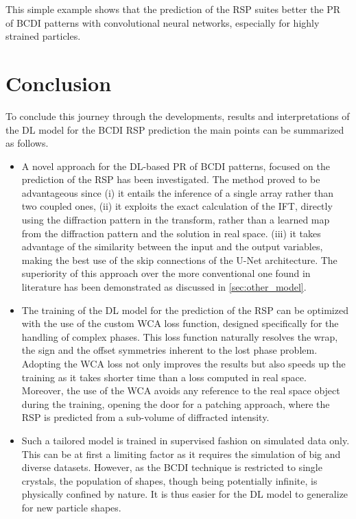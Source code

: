 This simple example shows that the prediction of the RSP suites better the PR of BCDI patterns with convolutional 
neural networks, especially for highly strained particles. 

\section{Conclusion}

To conclude this journey through the developments, results and interpretations of the DL model for the BCDI RSP prediction 
the main points can be summarized as follows.
\begin{itemize}

    \item A novel approach for the DL-based PR of BCDI patterns, focused on the prediction of the RSP has been investigated. 
    The method proved to be advantageous since (i) it entails the inference of a single array rather than two coupled ones, 
    (ii) it exploits the exact calculation of the IFT, directly using the diffraction pattern in the transform, rather than 
    a learned map from the diffraction pattern and the solution in real space. (iii) it takes advantage of the similarity between 
    the input and the output variables, making the best use of the skip connections of the U-Net architecture.
    The superiority of this approach over the more conventional one found in literature has been demonstrated as discussed in 
    \ref{sec:other_model}. 

    \item The training of the DL model for the prediction of the RSP can be optimized with the use of the custom WCA loss function, 
    designed specifically for the handling of complex phases. This loss function naturally resolves the wrap, the sign 
    and the offset symmetries inherent to the lost phase problem. Adopting the WCA loss not only improves the results but also 
    speeds up the training as it takes shorter time than a loss computed in real space. Moreover, the use of the WCA avoids 
    any reference to the real space object during the training, opening the door for a patching approach, where the RSP is 
    predicted from a sub-volume of diffracted intensity. 

    \item Such a tailored model is trained in supervised fashion on simulated data only. This can be at first a limiting factor 
    as it requires the simulation of big and diverse datasets. However, as the BCDI technique is restricted to single 
    crystals, the population of shapes, though being potentially infinite, is physically confined by nature. It is thus easier for 
    the DL model to generalize for new particle shapes. 


\end{itemize}
